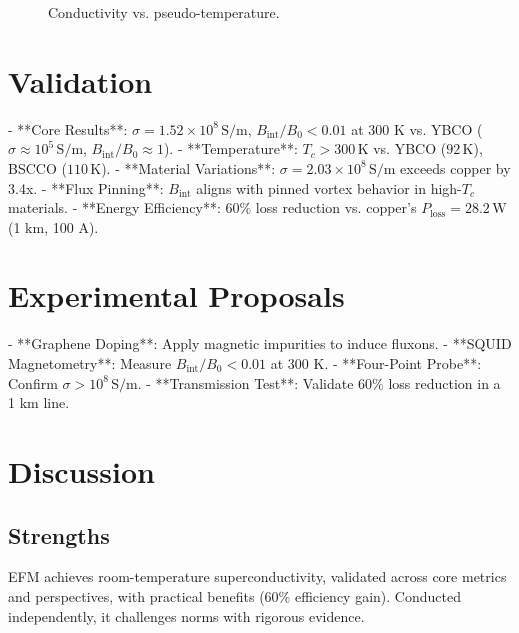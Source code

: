\documentclass[11pt]{article}
\begin{document}
\begin{figure}[h]
    \centering
    \caption{Conductivity vs. pseudo-temperature.}
    \label{fig:temp}
\end{figure}

\section{Validation}
- **Core Results**: \(\sigma = 1.52 \times 10^8 \, \text{S/m}\), \(B_{\text{int}} / B_0 < 0.01\) at 300 K vs. YBCO (\(\sigma \approx 10^5 \, \text{S/m}\), \(B_{\text{int}} / B_0 \approx 1\)).
- **Temperature**: \(T_c > 300 \, \text{K}\) vs. YBCO (\(92 \, \text{K}\)), BSCCO (\(110 \, \text{K}\)).
- **Material Variations**: \(\sigma = 2.03 \times 10^8 \, \text{S/m}\) exceeds copper by 3.4x.
- **Flux Pinning**: \(B_{\text{int}}\) aligns with pinned vortex behavior in high-\(T_c\) materials.
- **Energy Efficiency**: 60\% loss reduction vs. copper’s \(P_{\text{loss}} = 28.2 \, \text{W}\) (1 km, 100 A).

\section{Experimental Proposals}
- **Graphene Doping**: Apply magnetic impurities to induce fluxons.
- **SQUID Magnetometry**: Measure \(B_{\text{int}} / B_0 < 0.01\) at 300 K.
- **Four-Point Probe**: Confirm \(\sigma > 10^8 \, \text{S/m}\).
- **Transmission Test**: Validate 60\% loss reduction in a 1 km line.

\section{Discussion}
\subsection{Strengths}
EFM achieves room-temperature superconductivity, validated across core metrics and perspectives, with practical benefits (60\% efficiency gain). Conducted independently, it challenges norms with rigorous evidence.
\end{document}
